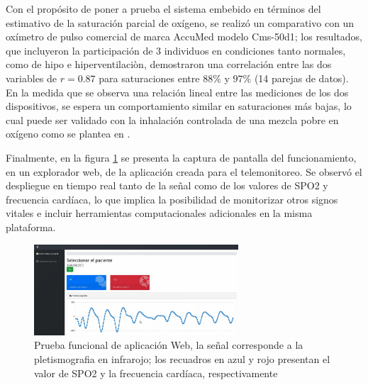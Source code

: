 \documentclass[journal]{IEEEtran}
\begin{document}
Con el propósito de poner a prueba el sistema embebido en términos del estimativo de la saturación parcial de oxígeno, se realizó un comparativo con un oxímetro de pulso comercial de marca AccuMed modelo Cms-50d1; los resultados, que incluyeron la participación de 3 individuos en condiciones tanto normales, como de hipo e hiperventilaciòn, 
demostraron una correlación entre las dos variables de $r=0.87$ para saturaciones entre $88\%$ y $97\%$ (14 parejas de datos). 
En la medida que se observa una relación lineal entre las mediciones de los dos dispositivos, se espera un comportamiento similar en saturaciones más bajas, lo cual puede ser validado con la inhalación controlada de una mezcla pobre en oxígeno como se plantea en \cite{G_validacion_sensor_maxim}.




Finalmente, en la figura \ref{resultado_aplicacion_web} se presenta la captura de pantalla del funcionamiento, en un explorador web, de la aplicación creada para el telemonitoreo. Se observó el despliegue en tiempo real tanto de la señal como de los valores de SPO2 y frecuencia cardíaca, lo que implica la posibilidad de monitorizar otros signos vitales e incluir herramientas computacionales adicionales en la misma plataforma.

\begin{figure}[!h]
	\centering
	\includegraphics[width=3in]{resultado_aplicacion_web.png}
	\caption{Prueba funcional de aplicación Web, la señal corresponde a la pletismografia en infrarojo; los recuadros en azul y rojo presentan el valor de SPO2 y la frecuencia cardíaca, respectivamente}
	\label{resultado_aplicacion_web}
\end{figure}
\end{document}
